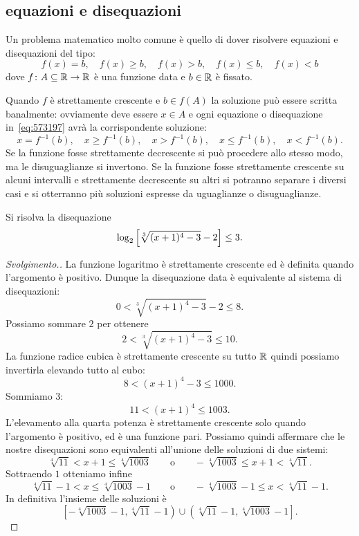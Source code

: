 \subsection{equazioni e disequazioni}

Un problema matematico molto comune è quello di dover risolvere 
equazioni e disequazioni del tipo:
\begin{equation}\label{eq:573197}
  f(x) = b, \quad f(x) \ge b, \quad f(x) > b, 
  \quad f(x) \le b, \quad f(x) < b
\end{equation}
dove $f\colon A \subseteq {\mathbb R} \to{\mathbb R}$ è una funzione data e 
$b\in {\mathbb R}$ è fissato.

Quando $f$ è strettamente crescente e $b\in f(A)$ 
la soluzione può essere 
scritta banalmente: 
ovviamente deve essere $x\in A$
e ogni equazione o disequazione in~\eqref{eq:573197}
avrà la corrispondente soluzione:
\[
  x= f^{-1}(b), \quad x \ge f^{-1}(b), \quad x>f^{-1}(b),
  \quad x \le f^{-1}(b), \quad x < f^{-1}(b).
\]
Se la funzione fosse strettamente decrescente 
si può procedere allo stesso modo, ma le disuguaglianze si invertono.
Se la funzione fosse strettamente crescente su alcuni intervalli 
e strettamente decrescente su altri si potranno separare i diversi 
casi e si otterranno più soluzioni espresse da uguaglianze
o disuguaglianze.

\begin{example}
  Si risolva la disequazione 
  \[
   \log_2{\left[ \sqrt[3]{(x+1)^4-3}-2 \right]} \le 3. 
  \]
\end{example}%
\begin{proof}[Svolgimento.]
La funzione logaritmo è strettamente crescente ed è definita 
quando l'argomento è positivo. 
Dunque la disequazione data 
è equivalente al sistema di disequazioni:
\[
0 < \sqrt[3]{(x+1)^4 - 3} - 2 \le 8.  
\]
Possiamo sommare $2$ per ottenere 
\[
  2 < \sqrt[3]{(x+1)^4 - 3} \le 10.  
\]
La funzione radice cubica è strettamente crescente 
su tutto ${\mathbb R}$ quindi possiamo invertirla elevando 
tutto al cubo:
\[
 8 < (x+1)^4 - 3 \le 1000.
\]
Sommiamo $3$:
\[
11 < (x+1)^4 \le 1003.  
\]
L'elevamento alla quarta potenza è strettamente crescente 
solo quando l'argomento è positivo, ed è una funzione pari.
Possiamo quindi affermare che le nostre disequazioni sono 
equivalenti all'unione delle soluzioni di due sistemi:
\[
  \sqrt[4]{11} < x+1 \le \sqrt[4]{1003}
  \qquad\text{o}\qquad 
  -\sqrt[4]{1003} \le x+1 < \sqrt[4]{11}.
\]
Sottraendo $1$ otteniamo infine 
\[
  \sqrt[4]{11} -1 < x \le \sqrt[4]{1003} - 1
  \qquad\text{o}\qquad 
  -\sqrt[4]{1003} -1 \le x < \sqrt[4]{11} -1.
\]
In definitiva l'insieme delle soluzioni è 
\[
\left[-\sqrt[4]{1003} - 1, \sqrt[4]{11}-1\right)
\cup \left(\sqrt[4]{11}-1 , \sqrt[4]{1003} -1\right].  
\]
\end{proof}

